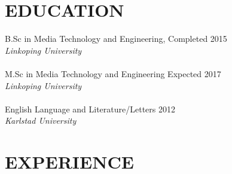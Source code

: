\documentclass{res}
\begin{document}
 


\address{\bf  PRESENT ADDRESS\\Kallvindsgatan 17\\602 40 Norrkoping, Sweden\\
+46 727 273125}
\address{\bf ADDITIONAL INFORMATION \\ Github: CarlEnglund \\ Mail: mail@carlenglund.se
\\ Website: www.carlenglund.se}

                                  
\begin{resume}
          
\section{EDUCATION}                
    B.Sc in Media Technology and Engineering, Completed 2015   \\
    \emph{Linkoping University} \\      
    \\ M.Sc in Media Technology and Engineering Expected 2017\\\emph{Linkoping University} \\  
    \\ English Language and Literature/Letters 2012\\\emph{Karlstad University} \\          
       

 
\section{EXPERIENCE}
   \vspace{-0.1in}
	

\end{resume}
\end{document}
